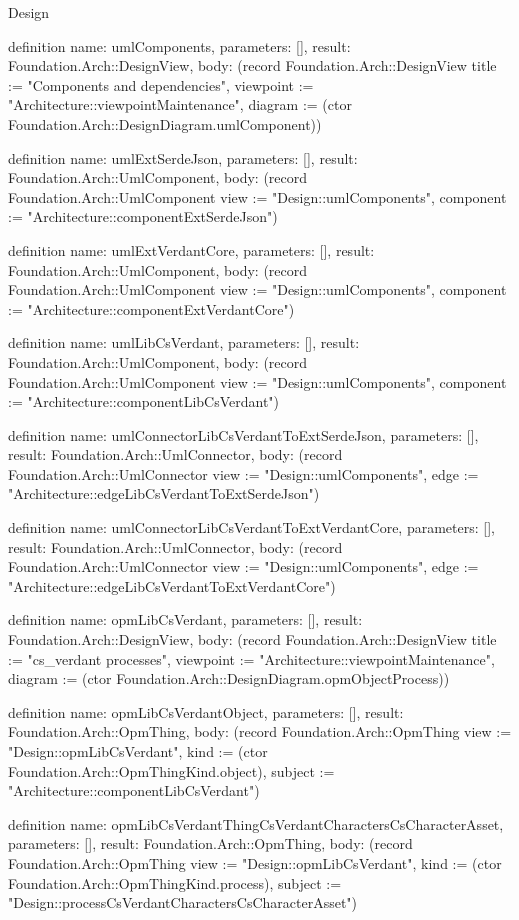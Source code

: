 \begin{lexlean}{Design}
\begin{semanticmodule}
definition{
  name: umlComponents,
  parameters: [],
  result: Foundation.Arch::DesignView,
  body: (record Foundation.Arch::DesignView {title := "Components and dependencies", viewpoint := "Architecture::viewpointMaintenance", diagram := (ctor Foundation.Arch::DesignDiagram.umlComponent)})
}

definition{
  name: umlExtSerdeJson,
  parameters: [],
  result: Foundation.Arch::UmlComponent,
  body: (record Foundation.Arch::UmlComponent {view := "Design::umlComponents", component := "Architecture::componentExtSerdeJson"})
}

definition{
  name: umlExtVerdantCore,
  parameters: [],
  result: Foundation.Arch::UmlComponent,
  body: (record Foundation.Arch::UmlComponent {view := "Design::umlComponents", component := "Architecture::componentExtVerdantCore"})
}

definition{
  name: umlLibCsVerdant,
  parameters: [],
  result: Foundation.Arch::UmlComponent,
  body: (record Foundation.Arch::UmlComponent {view := "Design::umlComponents", component := "Architecture::componentLibCsVerdant"})
}

definition{
  name: umlConnectorLibCsVerdantToExtSerdeJson,
  parameters: [],
  result: Foundation.Arch::UmlConnector,
  body: (record Foundation.Arch::UmlConnector {view := "Design::umlComponents", edge := "Architecture::edgeLibCsVerdantToExtSerdeJson"})
}

definition{
  name: umlConnectorLibCsVerdantToExtVerdantCore,
  parameters: [],
  result: Foundation.Arch::UmlConnector,
  body: (record Foundation.Arch::UmlConnector {view := "Design::umlComponents", edge := "Architecture::edgeLibCsVerdantToExtVerdantCore"})
}

definition{
  name: opmLibCsVerdant,
  parameters: [],
  result: Foundation.Arch::DesignView,
  body: (record Foundation.Arch::DesignView {title := "cs_verdant processes", viewpoint := "Architecture::viewpointMaintenance", diagram := (ctor Foundation.Arch::DesignDiagram.opmObjectProcess)})
}

definition{
  name: opmLibCsVerdantObject,
  parameters: [],
  result: Foundation.Arch::OpmThing,
  body: (record Foundation.Arch::OpmThing {view := "Design::opmLibCsVerdant", kind := (ctor Foundation.Arch::OpmThingKind.object), subject := "Architecture::componentLibCsVerdant"})
}

definition{
  name: opmLibCsVerdantThingCsVerdantCharactersCsCharacterAsset,
  parameters: [],
  result: Foundation.Arch::OpmThing,
  body: (record Foundation.Arch::OpmThing {view := "Design::opmLibCsVerdant", kind := (ctor Foundation.Arch::OpmThingKind.process), subject := "Design::processCsVerdantCharactersCsCharacterAsset"})
}


\end{semanticmodule}
\end{lexlean}
